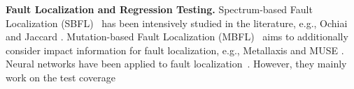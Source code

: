 \textbf{Fault Localization and Regression Testing.}
Spectrum-based Fault Localization (SBFL)~\cite{zhang2011localizing, abreu2007accuracy, jones2005empirical, abreu2006evaluation, naish2011model, wong2007effective, liblit2005scalable, lucia2014extended, keller2017critical} has been intensively studied in the literature, e.g., Ochiai \cite{abreu2006evaluation} and Jaccard \cite{abreu2007accuracy}. 
Mutation-based Fault Localization (MBFL)~\cite{moon2014ask, zhang2013injecting,budd1981mutation, zhang2010test, musco2017large} aims to additionally consider impact information for fault localization, e.g., Metallaxis \cite{papadakis2012using, papadakis2015metallaxis} and MUSE \cite{moon2014ask}.
%
%
Neural networks have been applied to fault
localization~\cite{zheng2016fault, briand2007using, zhang2017deep,
  wong2009bp}. However, they mainly work on the test coverage
